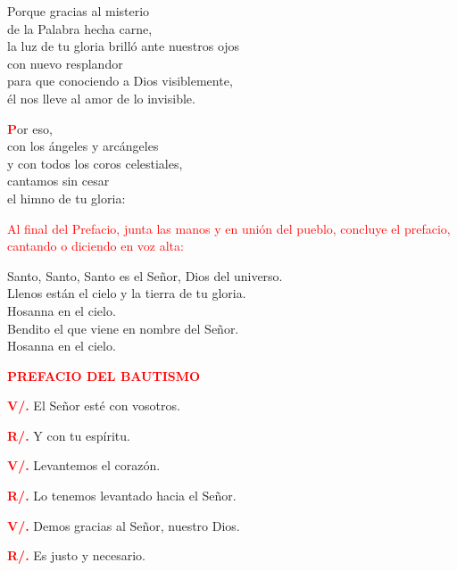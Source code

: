 \documentclass[12pt, letterpaper]{report}
\begin{document}
\noindent
\Large Porque gracias al misterio\\
    de la Palabra hecha carne,\\
    la luz de tu gloria brill\'o ante nuestros ojos\\
    con nuevo resplandor\\
    para que conociendo a Dios visiblemente,\\
    \'el nos lleve al amor de lo invisible.

\lettrine[lines=1]{\bfseries \textcolor{red}{P}}{}\Large or eso,\\
    con los \'angeles y arc\'angeles\\
    y con todos los coros celestiales,\\
    cantamos sin cesar\\
    el himno de tu gloria:

\large{\textcolor{red}{Al final del Prefacio, junta las manos y en uni\'on del pueblo, concluye el prefacio, cantando o diciendo en voz alta:}}

\noindent
\Large {Santo, Santo, Santo es el Se\~nor, Dios del universo.\\
Llenos est\'an el cielo y la tierra de tu gloria.\\
Hosanna en el cielo.\\
Bendito el que viene en nombre del Se\~nor.\\
Hosanna en el cielo.}

\newpage

\Large {\bfseries \textcolor{red}{PREFACIO DEL BAUTISMO}} 

\Large {\bfseries \textcolor{red}{V/.}} \hspace{0.5cm} El Se\~nor est\'e con vosotros.

\Large {\bfseries \textcolor{red}{R/.}} \hspace{0.5cm} Y con tu esp\'iritu. 

\Large {\bfseries \textcolor{red}{V/.}} \hspace{0.5cm} Levantemos el coraz\'on.

\Large {\bfseries \textcolor{red}{R/.}} \hspace{0.5cm} Lo tenemos levantado hacia el Se\~nor. 

\Large {\bfseries \textcolor{red}{V/.}} \hspace{0.5cm} Demos gracias al Se\~nor, nuestro Dios.

\Large {\bfseries \textcolor{red}{R/.}} \hspace{0.5cm} Es justo y necesario.
\end{document}
